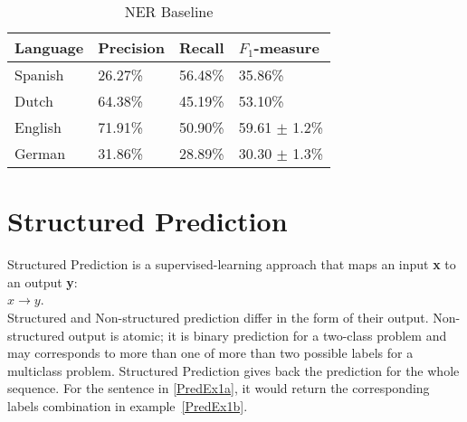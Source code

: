 \documentclass[11pt]{article}
\begin{document}


\begin{table}[h!]
\scriptsize
\begin{tabular}{|l|l|l|l|}
\hline
\bf Language & \bf Precision & \bf Recall & \bf $F_1$-measure \\ \hline
Spanish &             26.27\% & 56.48\% & 35.86\%        \\
Dutch  &             64.38\%  &45.19\%    & 53.10\%  \\
English &              71.91\%& 50.90\%  & 59.61 $\pm$ 1.2\%\\
German &      31.86\%  & 28.89\% & 30.30  $\pm$ 1.3\% \\
\hline
\end{tabular}
\caption{NER Baseline}
\label{table:Base}
\end{table}

\section{Structured Prediction}
Structured Prediction \cite{strlearn} is a supervised-learning approach that maps an input \textbf{x} to an output \textbf{y}: \\

$ x \rightarrow y $. \\

Structured and  Non-structured prediction differ in the form of their output. 
Non-structured output is atomic; it is binary prediction for a two-class problem and may corresponds to more than one of more than two possible labels for a 
multiclass problem. 
Structured Prediction gives back the prediction for the whole sequence. 
For the sentence in \ref{PredEx1a}, it would return the corresponding labels combination in example~\ref{PredEx1b}. 
\end{document}
